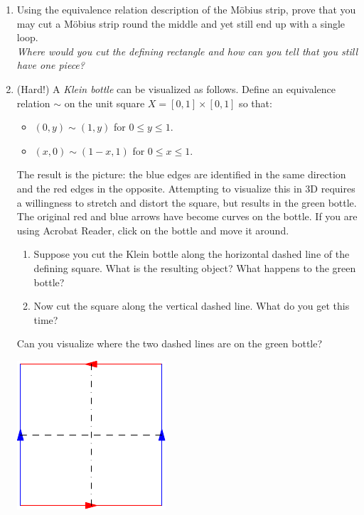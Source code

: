 \begin{exercises}{}{}
\begin{enumerate}
	\item Using the equivalence relation description of the Möbius strip, prove that you may cut a Möbius strip round the middle and yet still end up with a single loop.\\
	\emph{Where would you cut the defining rectangle and how can you tell that you still have one piece?}

	
	\item (Hard!) A \emph{Klein bottle} can be visualized as follows. Define an equivalence relation $\sim$ on the unit square $X=[0,1]\times[0,1]$ so that:
	\begin{itemize}
	  \item $(0,y)\sim (1,y)$ for $0\le y\le 1$.
	  \item $(x,0)\sim(1-x,1)$ for $0\le x\le 1$.
	\end{itemize}
	The result is the picture: the blue edges are identified in the same direction and the red edges in the opposite. Attempting to visualize this in 3D requires a willingness to stretch and distort the square, but results in the green bottle. The original red and blue arrows have become curves on the bottle. If you are using Acrobat Reader, click on the bottle and move it around.
	\begin{enumerate}
	  \item Suppose you cut the Klein bottle along the horizontal dashed line of the defining square. What is the resulting object? What happens to the green bottle?
	  \item Now cut the square along the vertical dashed line. What do you get this time?
	\end{enumerate}
	Can you visualize where the two dashed lines are on the green bottle?
	
	\includegraphics{relations-hw01-kleinsquare}

\end{enumerate}

\end{exercises}

